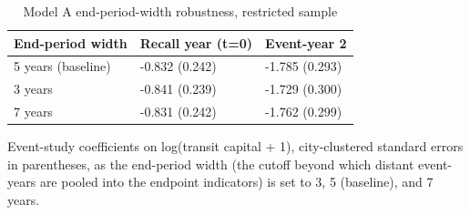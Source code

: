 \begin{table}

\caption{\label{tab:tab-robust-A}Model A end-period-width robustness, restricted sample}
\centering
\begin{threeparttable}
\begin{tabular}[t]{lll}
\toprule
End-period width & Recall year (t=0) & Event-year 2\\
\midrule
5 years (baseline) & -0.832 (0.242) & -1.785 (0.293)\\
3 years & -0.841 (0.239) & -1.729 (0.300)\\
7 years & -0.831 (0.242) & -1.762 (0.299)\\
\bottomrule
\end{tabular}
\begin{tablenotes}[para]
\item Event-study coefficients on log(transit capital + 1), city-clustered standard errors in parentheses, as the end-period width (the cutoff beyond which distant event-years are pooled into the endpoint indicators) is set to 3, 5 (baseline), and 7 years.
\end{tablenotes}
\end{threeparttable}
\end{table}
